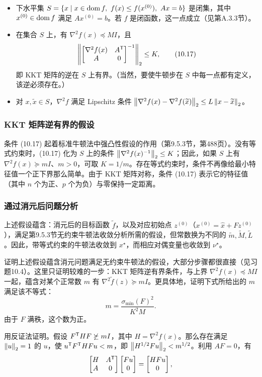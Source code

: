 \begin{itemize}
\item 下水平集 $S=\{x\mid x\in\dom f,\ f(x)\le f(x^{(0)}),\ Ax=b\}$ 是闭集，其中 $x^{(0)}\in\operatorname{dom} f$ 满足 $Ax^{(0)}=b$。若 $f$ 是闭函数，这一点成立（见第A.3.3节）。
\item 在集合 $S$ 上，有 $\nabla^2f(x)\preceq MI$，且
\begin{equation}\left\|\begin{bmatrix}\nabla^2f(x)&A^\mathsf T\\A&0\end{bmatrix}^{-1}\right\|_2\le K,\tag{10.17}\end{equation}
即 KKT 矩阵的逆在 $S$ 上有界。（当然，要使牛顿步在 $S$ 中每一点都有定义，该逆必须存在。）
\item 对 $x,\widetilde x\in S$，$\nabla^2f$ 满足 Lipschitz 条件 $\left\lVert \nabla^2f(x)-\nabla^2f(\widetilde x)\right\rVert_2\le L\left\lVert x-\widetilde x\right\rVert_2$。
\end{itemize}

\subsubsection*{KKT 矩阵逆有界的假设}
条件 (10.17) 起着标准牛顿法中强凸性假设的作用（第9.5.3节，第488页）。没有等式约束时，(10.17) 化为 $S$ 上的条件 $\left\lVert \nabla^2f(x)^{-1}\right\rVert_2\le K$；因此，如果 $S$ 上有 $\nabla^2f(x)\succeq mI$、$m>0$，可取 $K=1/m$。存在等式约束时，条件不再像给最小特征值一个正下界那么简单。由于 KKT 矩阵对称，条件 (10.17) 表示它的特征值（其中 $n$ 个为正、$p$ 个为负）与零保持一定距离。

\subsubsection*{通过消元后问题分析}
上述假设蕴含：消元后的目标函数 $\widetilde f$，以及对应初始点 $z^{(0)}$（$x^{(0)}=\widehat x+Fz^{(0)}$），满足第9.5.3节无约束牛顿法收敛分析所需的假设，但常数换为不同的 $\widetilde m,\widetilde M,\widetilde L$。因此，带等式约束的牛顿法收敛到 $x^\star$，而相应对偶变量也收敛到 $\nu^\star$。

证明上述假设蕴含消元问题满足无约束牛顿法的假设，大部分步骤都很直接（见习题10.4）。这里只证明较难的一步：KKT 矩阵逆有界条件，与上界 $\nabla^2f(x)\preceq MI$ 一起，蕴含对某个正常数 $m$ 有 $\nabla^2\widetilde f(z)\succeq mI$。更具体地，证明下式所给出的 $m$ 满足该不等式：
\begin{equation}m=\frac{\sigma_{\min}(F)^2}{K^2M}.\tag{10.18}\end{equation}
由于 $F$ 满秩，这个数为正。

用反证法证明。假设 $F^\mathsf T HF\not\succeq mI$，其中 $H=\nabla^2f(x)$。那么存在满足 $\left\lVert u\right\rVert_2=1$ 的 $u$，使 $u^\mathsf T F^\mathsf T HFu<m$，即 $\left\lVert H^{1/2}Fu\right\rVert_2<m^{1/2}$。利用 $AF=0$，有
\[\begin{bmatrix}H&A^\mathsf T\\A&0\end{bmatrix}\begin{bmatrix}Fu\\0\end{bmatrix}=\begin{bmatrix}HFu\\0\end{bmatrix},\]

